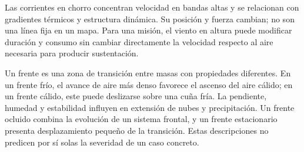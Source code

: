 Las corrientes en chorro concentran velocidad en bandas altas y se relacionan con gradientes térmicos y estructura dinámica. Su posición y fuerza cambian; no son una línea fija en un mapa. Para una misión, el viento en altura puede modificar duración y consumo sin cambiar directamente la velocidad respecto al aire necesaria para producir sustentación.

Un frente es una zona de transición entre masas con propiedades diferentes. En un frente frío, el avance de aire más denso favorece el ascenso del aire cálido; en un frente cálido, este puede deslizarse sobre una cuña fría. La pendiente, humedad y estabilidad influyen en extensión de nubes y precipitación. Un frente ocluido combina la evolución de un sistema frontal, y un frente estacionario presenta desplazamiento pequeño de la transición. Estas descripciones no predicen por sí solas la severidad de un caso concreto.

